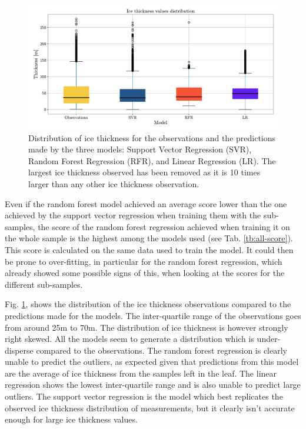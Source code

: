 \begin{figure}[!tp]
	\centering		  
	\includegraphics[width=1.\textwidth]{figures/thick_box.pdf}
	\caption{Distribution of ice thickness for the observations and the predictions made by the three models: Support Vector Regression (SVR), Random Forest Regression (RFR), and Linear Regression (LR). The largest ice thickness observed has been removed as it is 10 times larger than any other ice thickness observation.}
	\label{fig:thick-distr}
\end{figure}

Even if the random forest model achieved an average score lower than the one achieved by the support vector regression when training them with the sub-samples, the score of the random forest regression achieved when training it on the whole sample is the highest among the models used (see Tab. \ref{tb:all-score}). This score is calculated on the same data used to train the model. It could then be prone to over-fitting, in particular for the random forest regression, which already showed some possible signs of this, when looking at the scores for the different sub-samples.

Fig. \ref{fig:thick-distr}, shows the distribution of the ice thickness observations compared to the predictions made for the models. The inter-quartile range of the observations goes from around 25m to 70m. The distribution of ice thickness is however strongly right skewed. All the models seem to generate a distribution which is under-disperse compared  to the observations. The random forest regression is clearly unable to predict the outliers, as expected given that predictions from this model are the average of ice thickness from the samples left in the leaf. The linear regression shows the lowest inter-quartile range and is also unable to predict large outliers. The support vector regression is the model which best replicates the observed ice thickness distribution of measurements, but it clearly isn't accurate enough for large ice thickness values.

